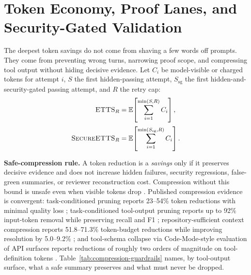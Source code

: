 \documentclass[conference]{IEEEtran}
\newcommand{\etts}{\textnormal{\textsc{ETTS}}}
\newcommand{\secureetts}{\textnormal{\textsc{SecureETTS}}}
\begin{document}
\section{Token Economy, Proof Lanes, and Security-Gated Validation}
\label{sec:token}
The deepest token savings do not come from shaving a few words off prompts. They come from preventing wrong turns, narrowing proof scope, and compressing tool output without hiding decisive evidence. Let $C_i$ be model-visible or charged tokens for attempt $i$, $S$ the first hidden-passing attempt, $S_{\mathrm{sg}}$ the first hidden-and-security-gated passing attempt, and $R$ the retry cap:
\begin{align}
  \etts_R       &= \mathbb{E}\!\left[\sum_{i=1}^{\min(S,R)} C_i\right], \\[2pt]
  \secureetts_R &= \mathbb{E}\!\left[\sum_{i=1}^{\min(S_{\mathrm{sg}},R)} C_i\right].
\end{align}

\noindent\textbf{Safe-compression rule.} A token reduction is a \emph{savings} only if it preserves decisive evidence and does not increase hidden failures, security regressions, false-green summaries, or reviewer reconstruction cost. Compression without this bound is unsafe even when visible tokens drop \cite{sweEffi2025,susvibes2025,swePruner2026,squeez2026,compressingCodeContext2026,cloudflareCodeMode2026}. Published compression evidence is convergent: task-conditioned pruning reports 23--54\% token reductions with minimal quality loss \cite{swePruner2026}; task-conditioned tool-output pruning reports up to 92\% input-token removal while preserving recall and F1 \cite{squeez2026}; repository-sufficient context compression reports 51.8--71.3\% token-budget reductions while improving resolution by 5.0--9.2\% \cite{compressingCodeContext2026}; and tool-schema collapse via Code-Mode-style evaluation of API surfaces reports reductions of roughly two orders of magnitude on tool-definition tokens \cite{cloudflareCodeMode2026}. Table~\ref{tab:compression-guardrails} names, by tool-output surface, what a safe summary preserves and what must never be dropped.
\end{document}
